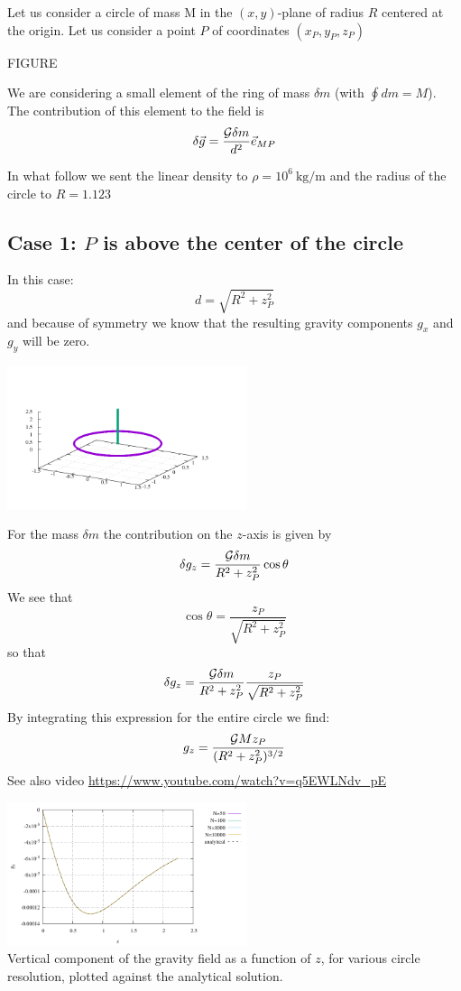 

Let us consider a circle of mass M in the $(x,y)$-plane of radius $R$ centered at the origin.
Let us consider a point $P$ of coordinates $(x_P,y_P,z_P)$ 

FIGURE


We are considering a small element of the ring of mass $\delta m$ (with $\oint dm = M$). 
The contribution of this element to the field is
\[
\delta \vec{g} = \frac{{\cal G} \delta m}{d^2} \vec{e}_{MP}
\]

In what follow we sent the linear density to $\rho=10^6~\si{\kg\per\meter}$ and 
the radius of the circle to $R=1.123$

\subsection*{Case 1: $P$ is above the center of the circle}

In this case:
\[
d=\sqrt{R^2 + z_P^2}
\]
and because of symmetry we know that the resulting 
gravity components $g_x$ and $g_y$ will be zero.

\begin{center}
\includegraphics[width=7cm]{python_codes/fieldstone_132/results/case1/setup.pdf}
\end{center}

For the mass $\delta m$ the contribution on the $z$-axis
is given by 
\[
\delta g_z = \frac{{\cal G} \delta m}{R^2+z_P^2} \cos\theta 
\] 
We see that 
\[
\cos\theta = \frac{z_P}{\sqrt{R^2+z_P^2}}
\]
so that
\[
\delta g_z = \frac{{\cal G} \delta m}{R^2+z_P^2}\frac{z_P}{\sqrt{R^2+z_P^2}}
\] 
By integrating this expression for the entire circle we find:
\[
g_z=\frac{{\cal G} M z_P}{(R^2+z_P^2)^{3/2}}
\]
See also video \url{https://www.youtube.com/watch?v=q5EWLNdv_pE}

\begin{center}
\includegraphics[width=7cm]{python_codes/fieldstone_132/results/case1/gz.pdf}\\
{\captionfont Vertical component of the gravity field as a function of $z$, 
for various circle resolution, plotted against the analytical solution.}
\end{center}




